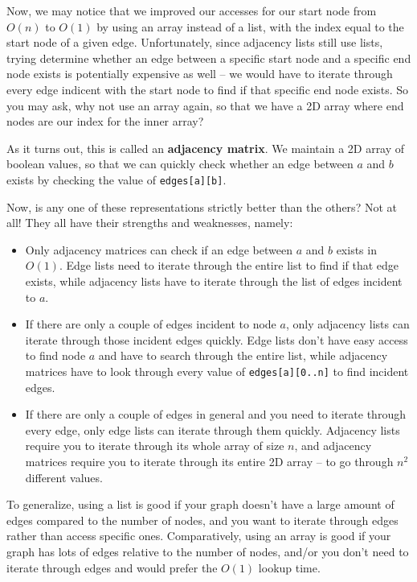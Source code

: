 
Now, we may notice that we improved our accesses for our start node from $O(n)$ to $O(1)$ by using an array instead of a list, with the index equal to the start node of a given edge. Unfortunately, since adjacency lists still use lists, trying determine whether an edge between a specific start node and a specific end node exists is potentially expensive as well -- we would have to iterate through every edge indicent with the start node to find if that specific end node exists. So you may ask, why not use an array again, so that we have a 2D array where end nodes are our index for the inner array?

As it turns out, this is called an \textbf{adjacency matrix}. We maintain a 2D array of boolean values, so that we can quickly check whether an edge between $a$ and $b$ exists by checking the value of \texttt{edges[a][b]}.


Now, is any one of these representations strictly better than the others? Not at all! They all have their strengths and weaknesses, namely:
\begin{itemize}
\item Only adjacency matrices can check if an edge between $a$ and $b$ exists in $O(1)$. Edge lists need to iterate through the entire list to find if that edge exists, while adjacency lists have to iterate through the list of edges incident to $a$.
\item If there are only a couple of edges incident to node $a$, only adjacency lists can iterate through those incident edges quickly. Edge lists don't have easy access to find node $a$ and have to search through the entire list, while adjacency matrices have to look through every value of \texttt{edges[a][0..n]} to find incident edges.
\item If there are only a couple of edges in general and you need to iterate through every edge, only edge lists can iterate through them quickly. Adjacency lists require you to iterate through its whole array of size $n$, and adjacency matrices require you to iterate through its entire 2D array -- to go through $n^2$ different values.
\end{itemize}
To generalize, using a list is good if your graph doesn't have a large amount of edges compared to the number of nodes, and you want to iterate through edges rather than access specific ones. Comparatively, using an array is good if your graph has lots of edges relative to the number of nodes, and/or you don't need to iterate through edges and would prefer the $O(1)$ lookup time.

